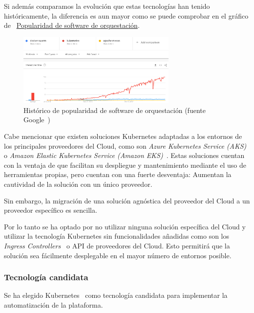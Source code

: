 \par Si además comparamos la evolución que estas tecnologías han tenido históricamente, la diferencia es aun mayor como se puede comprobar en el gráfico de {~\hyperref[fig:orquestatorspopularity]{Popularidad de software de orquestación}}. 
\begin{figure}[!htb]
  \centering
  \label{fig:orquestatorspopularity}
  \includegraphics[width=0.7\textwidth]{fig/KubernetesSwarmMesos}
  \caption{Histórico de popularidad de software de orquestación (fuente Google~\cite{KubernetesSwarmMesos})}
\end{figure}

\par Cabe mencionar que existen soluciones Kubernetes adaptadas a los entornos de los principales proveedores del Cloud, como son {\em Azure Kubernetes Service (AKS)~\cite{aks}} o
{\em Amazon Elastic Kubernetes Service (Amazon EKS)~\cite{eks}}. Estas soluciones cuentan con la ventaja de que facilitan su despliegue y mantenimiento mediante
el uso de herramientas propias, pero cuentan con una fuerte desventaja: Aumentan la cautividad de la solución con un único proveedor.
\par Sin embargo, la migración de una solución agnóstica del proveedor del Cloud a un proveedor específico es sencilla.
\par Por lo tanto se ha optado por no utilizar ninguna solución específica del Cloud y utilizar la tecnología Kubernetes sin funcionalidades añadidas como son
los {\em Ingress Controllers~\cite{ingresscontrollers}} o API de proveedores del Cloud. Esto permitirá que la solución sea fácilmente desplegable en el mayor
número de entornos posible.

\subsubsection{Tecnología candidata}
\par Se ha elegido Kubernetes~\cite{kubernetes} como tecnología candidata para implementar la automatización de la plataforma.

